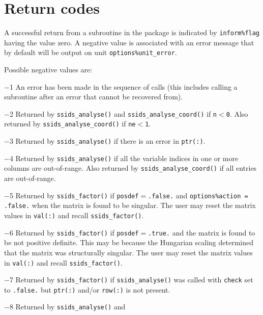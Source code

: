 
\section{Return codes} \label{errors}

A successful return from a subroutine in the package is indicated by
{\tt inform\%flag} having the value zero.
A negative value is associated with an error message that by default will
be output on unit {\tt options\%unit\_error}.

Possible negative values are:

\begin{description}
\item{$-$1} An error has been made in the sequence of calls (this includes
            calling a subroutine after an error that cannot be recovered from).
\item{$-$2} Returned by {\tt ssids\_analyse()} and {\tt ssids\_analyse\_coord()}
            if {\tt n$<$0}. Also returned by {\tt ssids\_analyse\_coord()} if
            {\tt ne$<$1}.
\item{$-$3} Returned by {\tt ssids\_analyse()} if there is an error in
            {\tt ptr(:)}.
\item{$-$4} Returned by {\tt ssids\_analyse()} if all the variable indices in
            one or more columns  are out-of-range. Also returned by
            {\tt ssids\_analyse\_coord()} if all entries are out-of-range.
\item{$-$5} Returned by {\tt ssids\_factor()} if
            {\tt posdef}$=${\tt .false.} and
            {\tt options\%action = .false.} when the matrix is found to be
            singular. The user may reset the matrix values in {\tt val(:)}
            and recall {\tt ssids\_factor()}.
\item{$-$6} Returned by {\tt ssids\_factor()} if
            {\tt posdef}$=${\tt .true.} and the matrix is found to
            be not positive definite. This may be because the Hungarian scaling
            determined that the matrix was structurally singular. The user may
            reset the matrix values in {\tt val(:)} and recall
            {\tt ssids\_factor()}.
\item{$-$7} Returned by {\tt ssids\_factor()} if {\tt ssids\_analyse()} was
            called with {\tt check} set to {\tt .false.} but {\tt ptr(:)}
            and/or {\tt row(:)} is not present.
\item{$-$8} Returned by {\tt ssids\_analyse()}  and

\end{description}
